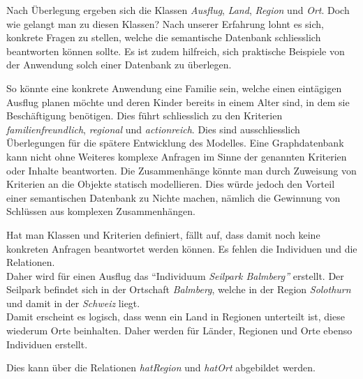Nach Überlegung ergeben sich die Klassen \textit{Ausflug}, \textit{Land}, \textit{Region} und \textit{Ort}. Doch wie gelangt man zu diesen Klassen? Nach unserer Erfahrung lohnt es sich, konkrete Fragen zu stellen, welche die semantische Datenbank schliesslich beantworten können sollte. Es ist zudem hilfreich, sich praktische Beispiele von der Anwendung solch einer Datenbank zu überlegen.

So könnte eine konkrete Anwendung eine Familie sein, welche einen eintägigen Ausflug planen möchte und deren Kinder bereits in einem Alter sind, in dem sie Beschäftigung benötigen. Dies führt schliesslich zu den Kriterien \textit{familienfreundlich}, \textit{regional} und \textit{actionreich}. Dies sind ausschliesslich Überlegungen für die spätere Entwicklung des Modelles. Eine Graphdatenbank kann nicht ohne Weiteres komplexe Anfragen im Sinne der genannten Kriterien oder Inhalte beantworten. Die Zusammenhänge könnte man durch Zuweisung von Kriterien an die Objekte statisch modellieren. Dies würde jedoch den Vorteil einer semantischen Datenbank zu Nichte machen, nämlich die Gewinnung von Schlüssen aus komplexen Zusammenhängen.

Hat man Klassen und Kriterien definiert, fällt auf, dass damit noch keine konkreten Anfragen beantwortet werden können. Es fehlen die Individuen und die Relationen.\\
Daher wird für einen Ausflug das ``Individuum \textit{Seilpark Balmberg''} erstellt. Der Seilpark befindet sich in der Ortschaft \textit{Balmberg}, welche in der Region \textit{Solothurn} und damit in der \textit{Schweiz} liegt.\\
Damit erscheint es logisch, dass wenn ein Land in Regionen unterteilt ist, diese wiederum Orte beinhalten. Daher werden für Länder, Regionen und Orte ebenso Individuen erstellt.

Dies kann über die Relationen \textit{hatRegion} und \textit{hatOrt} abgebildet werden.

